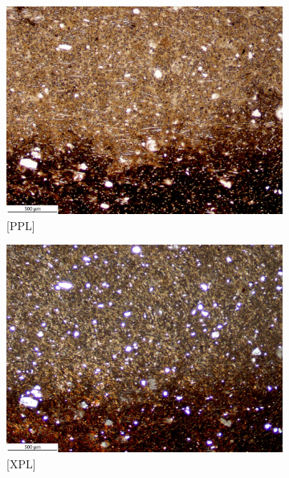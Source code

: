 \documentclass[a4paper]{article}
\begin{document}
\begin{figure}[H]
	\centering
	\begin{subfigure}[t]{.49\textwidth}
		\includegraphics[width=\textwidth]{ThinSections/3-1_4x_PPL.jpg}
		\caption{[PPL]}
	\end{subfigure}\hspace{.5em}\hfill
	\begin{subfigure}[t]{.49\textwidth}
		\includegraphics[width=\textwidth]{ThinSections/3-1_4x_XPL.jpg}
		\caption{[XPL]}
	\end{subfigure}
	\begin{subfigure}[t]{.49\textwidth}

\end{subfigure}
\end{figure}
\end{document}
